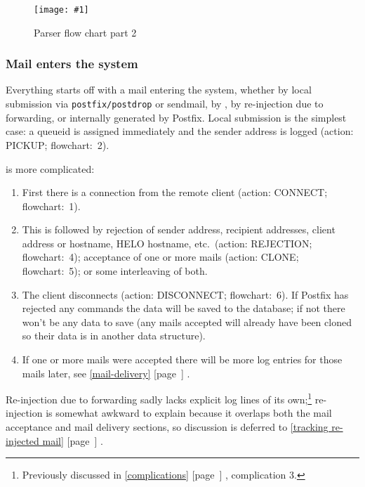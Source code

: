 \documentclass[a4paper,12pt,draft]{article}
\newcommand{\showgraph}[3]{
    \begin{figure}[hbt!]
        \caption{#2}\label{#3}
        \texttt{[image: \#1]}
    \end{figure}
}
\newcommand{\refwithpage}[1]{%
    \empty{}\ref{#1} [page~\pageref{#1}]%
}
\newcommand{\sectionref}[1]{%
    \textsection{}\refwithpage{#1}%
}
\newcommand{\daemon}[1]{%
    \texttt{postfix/#1}%
}
\begin{document}
\showgraph{build/logparser-flow-chart-part-2}{Parser flow chart part
2}{flow chart image part 2}

\clearpage

\subsubsection{Mail enters the system}

\label{mail-enters-the-system}

Everything starts off with a mail entering the system, whether by local
submission via \daemon{postdrop} or sendmail, by \SMTP{}, by re-injection
due to forwarding, or internally generated by Postfix.  Local submission is
the simplest case: a queueid is assigned immediately and the sender address
is logged (action: PICKUP\@; flowchart:~2).

\SMTP{} is more complicated:

\begin{enumerate}

    \item First there is a connection from the remote client (action:
        CONNECT\@; flowchart:~1).

    \item This is followed by rejection of sender address, recipient
        addresses, client \IP{} address or hostname, HELO hostname, etc.\
        (action: REJECTION\@; flowchart:~4); acceptance of one or more
        mails (action: CLONE\@; flowchart:~5); or some interleaving of
        both.

    \item The client disconnects (action: DISCONNECT\@; flowchart:~6).  If
        Postfix has rejected any \SMTP{} commands the data will be saved to
        the database; if not there won't be any data to save (any mails
        accepted will already have been cloned so their data is in another
        data structure).

    \item If one or more mails were accepted there will be more log entries
        for those mails later, see \sectionref{mail-delivery}.

\end{enumerate}

Re-injection due to forwarding sadly lacks explicit log lines of its
own;\footnote{Previously discussed in \sectionref{complications},
complication 3.} re-injection is somewhat awkward to explain because it
overlaps both the mail acceptance and mail delivery sections, so discussion
is deferred to \sectionref{tracking re-injected mail}.
\end{document}
